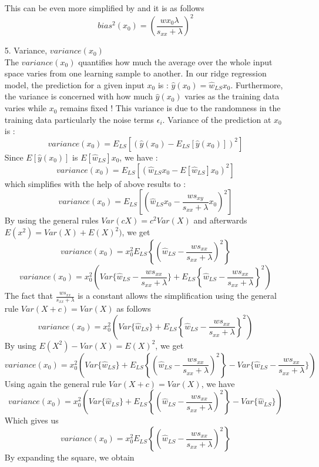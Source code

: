 \documentclass[12pt,titlepage]{article}
\begin{document}
\begin{enumerate}
    This can be even more simplified by and it is as follows
    $$ bias^{2}(x_{0}) =\left(\frac{w x_{0} \lambda}{s_{xx} + \lambda}\right)^{2}$$
    \item[5.] Variance, $variance(x_{0})$ \\
    The $variance(x_{0})$ quantifies how much the average over the whole input space varies from one learning sample to another. In our ridge regression model, the prediction for a given input $x_{0}$ is : $\hat{y}(x_{0}) = \hat{w}_{LS}x_{0}$.
    Furthermore, the variance is concerned with how much $\hat{y}(x_{0})$ varies as the training data varies while $x_{0}$ remains fixed ! This variance is due to the randomness in the training data particularly the noise terms $\epsilon_{i}$. Variance of the prediction at $x_{0}$ is :
    $$ variance(x_{0}) = E_{LS}[(\hat{y}(x_{0})-E_{LS}[\hat{y}(x_{0})])^{2}] $$
    Since $E[\hat{y}(x_{0})]$ is $E[\hat{w}_{LS}]x_{0}$, we have :
    $$ variance(x_{0}) = E_{LS}[(\hat{w}_{LS}x_{0} - E[\hat{w}_{LS}]x_{0})^{2}] $$
    which simplifies with the help of above results to :
    $$ variance(x_{0}) = E_{LS}[(\hat{w}_{LS}x_{0} - \frac{ws_{xy}}{s_{xx} + \lambda}x_{0})^{2}]$$
    By using the general rules $Var(cX) = c^{2}Var(X)$ and afterwards $E(x^{2}) = Var(X) + E(X)^{2})$, we get 
    $$ variance(x_{0}) = x_{0}^{2} E_{LS} \left\{ (\hat{w}_{LS} - \frac{w s_{xx}}{s_{xx} + \lambda})^{2} \right\}$$
    $$ variance(x_{0}) = x_{0}^{2} \left(Var\{\hat{w}_{LS} - \frac{w s_{xx}}{s_{xx} + \lambda}\} + E_{LS} \left\{\hat{w}_{LS} - \frac{w s_{xx}}{s_{xx} + \lambda}\right\}^{2}\right)$$
    The fact that $\frac{w s_{xx}}{s_{xx} + \lambda}$ is a constant allows the simplification using the general rule $Var(X + c) = Var(X)$ as follows
    $$ variance(x_{0}) = x_{0}^{2} \left(Var\{\hat{w}_{LS}\} + E_{LS} \left\{\hat{w}_{LS} - \frac{w s_{xx}}{s_{xx} + \lambda}\right\}^{2}\right)$$
    By using $E(X^{2}) - Var(X) = E(X)^{2}$, we get
    $$ variance(x_{0}) = x_{0}^{2} \left(Var\{\hat{w}_{LS}\} + E_{LS} \left\{\left(\hat{w}_{LS} - \frac{w s_{xx}}{s_{xx} + \lambda}\right)^{2} \right\} - Var\{\hat{w}_{LS} - \frac{w s_{xx}}{s_{xx} + \lambda}\} \right) $$
    Using again the general rule $Var(X + c) = Var(X)$, we have
    $$ variance(x_{0}) = x_{0}^{2} \left(Var\{\hat{w}_{LS}\} + E_{LS} \left\{\left(\hat{w}_{LS} - \frac{w s_{xx}}{s_{xx} + \lambda}\right)^{2} \right\} - Var\{\hat{w}_{LS}\} \right) $$
    Which gives us 
    $$ variance(x_{0}) = x_{0}^{2} E_{LS} \left\{\left(\hat{w}_{LS} - \frac{w s_{xx}}{s_{xx} + \lambda}\right)^{2} \right\} $$
    By expanding the square, we obtain

\end{enumerate}
\end{document}
